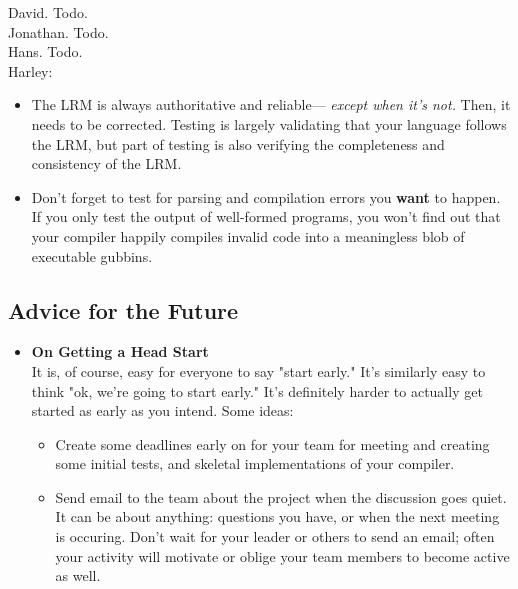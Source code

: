 David. Todo.\\

Jonathan. Todo.\\

Hans. Todo.\\

Harley:
\begin{itemize}
\item The LRM is always authoritative and reliable--- {\it except when it's not.} Then, it needs to be corrected. Testing is largely validating that your language follows the LRM, but part of testing is  also verifying the completeness  and consistency of the LRM. 
\item Don't forget to test for parsing and compilation errors you {\bf want} to happen. If you only test the output of well-formed programs, you won't find out that your compiler happily compiles invalid code into a meaningless blob of executable gubbins.
\end{itemize}

\subsection{Advice for the Future}
\begin{itemize}
\item {\bf On Getting a Head Start}\\
It is, of course, easy for everyone to say "start early." It's similarly easy to think "ok, we're going to start early."  It's definitely harder to actually get started as early as you intend. Some ideas:
\begin{itemize}
\item Create some deadlines early on for your team for meeting and creating some initial tests, and skeletal implementations of your compiler. 
\item Send email to the  team about the project when the discussion goes quiet. It can be about anything: questions you have, or when the next meeting is occuring. Don't wait for your leader or others to send an email; often your activity will motivate or oblige your team members to become active as well.
\end{itemize}
\end{itemize}